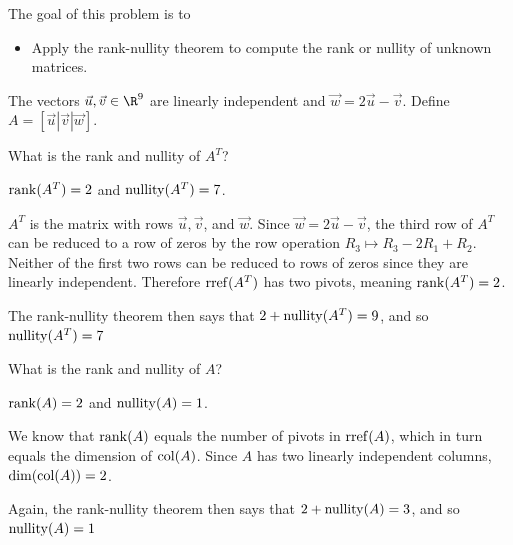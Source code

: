 \documentclass{problemset}
\begin{document}
	\question
	\begin{annotation}
		\begin{goals}

			The goal of this problem is to
			\begin{itemize}
				\item Apply the rank-nullity theorem to compute the rank or nullity of unknown matrices.
			\end{itemize}
		\end{goals}
	\end{annotation}
	The vectors $\vec u,\vec v\in\R^9$ are linearly independent and $\vec w=2\vec u-\vec v$.
	Define $A=[\vec u|\vec v|\vec w]$.
	\begin{parts}
		\item What is the rank and nullity of $A^T$?
			\begin{solution}
				$\operatorname{rank}(A^T)=2$ and $\operatorname{nullity}(A^T)=7$.

				$A^T$ is the matrix with rows $\vec u,\vec v$, and $\vec w$.
				Since $\vec w=2\vec u-\vec v$, the third row of $A^T$ can be
				reduced to a row of zeros by the row operation
				$R_3\mapsto R_3-2R_1+R_2$. Neither of the first two rows can be
				reduced to rows of zeros since they are linearly independent.
				Therefore $\operatorname{rref}(A^T)$ has two pivots, meaning $\operatorname{rank}(A^T)=2$.

				The rank-nullity theorem then says that $2+\operatorname{nullity}(A^T)=9$, and so
				$\operatorname{nullity}(A^T)=7$
			\end{solution}
		\item What is the rank and nullity of $A$?
			\begin{solution}
				$\operatorname{rank}(A)=2$ and $\operatorname{nullity}(A)=1$.

				We know that $\operatorname{rank}(A)$ equals the number of pivots in $\operatorname{rref}(A)$,
				which in turn equals the dimension of $\operatorname{col}(A)$. Since $A$ has two
				linearly independent columns, $\operatorname{dim}(\operatorname{col}(A))=2$.

				Again, the rank-nullity theorem then says that $2+\operatorname{nullity}(A)=3$,
				and so $\operatorname{nullity}(A)=1$
			\end{solution}
	\end{parts}
\end{document}

